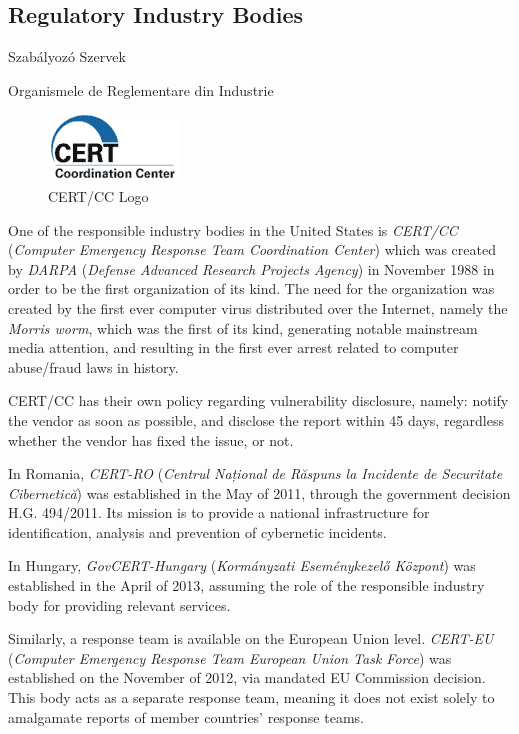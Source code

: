 \documentclass[a4paper,12pt]{article}
\newcommand\subsectionhu[1]{\addcontentsline{toc.hu}{subsection} {\protect\numberline{\thesubsection} #1}}
\newcommand\subsectionro[1]{\addcontentsline{toc.ro}{subsection} {\protect\numberline{\thesubsection} #1}}
\begin{document}
\subsection{Regulatory Industry Bodies}
\subsectionhu{Szabályozó Szervek} \subsectionro{Organismele de Reglementare din Industrie}
	
	\begin{figure}
		\vspace{-10pt}
		\centering
		\includegraphics[scale=0.75]{cert.png}
		\caption{CERT/CC Logo}
	\end{figure}
	
	One of the responsible industry bodies in the United States is \textit{CERT/CC} (\textit{Computer Emergency Response Team Coordination Center}) which was created by \textit{DARPA} (\textit{Defense Advanced Research Projects Agency}) in November 1988 in order to be the first organization of its kind. The need for the organization was created by the first ever computer virus distributed over the Internet, namely the \textit{Morris worm}\cite{cert15}, which was the first of its kind, generating notable mainstream media attention, and resulting in the first ever arrest related to computer abuse/fraud laws in history.
	
	CERT/CC has their own policy regarding vulnerability disclosure, namely: notify the vendor as soon as possible, and disclose the report within 45 days, regardless whether the vendor has fixed the issue, or not.
	
	In Romania, \textit{CERT-RO} (\textit{Centrul Național de Răspuns la Incidente de Securitate Cibernetică}) was established in the May of 2011, through the government decision H.G. 494/2011\cite{certro12}. Its mission is to provide a national infrastructure for identification, analysis and prevention of cybernetic incidents.
	
	In Hungary, \textit{GovCERT-Hungary} (\textit{Kormányzati Eseménykezelő Központ}) was established in the April of 2013\cite{certhu13}, assuming the role of the responsible industry body for providing relevant services.
	
	Similarly, a response team is available on the European Union level. \textit{CERT-EU} (\textit{Computer Emergency Response Team European Union Task Force}) was established on the November of 2012\cite{certeu13}, via mandated EU Commission decision. This body acts as a separate response team, meaning it does not exist solely to amalgamate reports of member countries' response teams.
	
\end{document}
